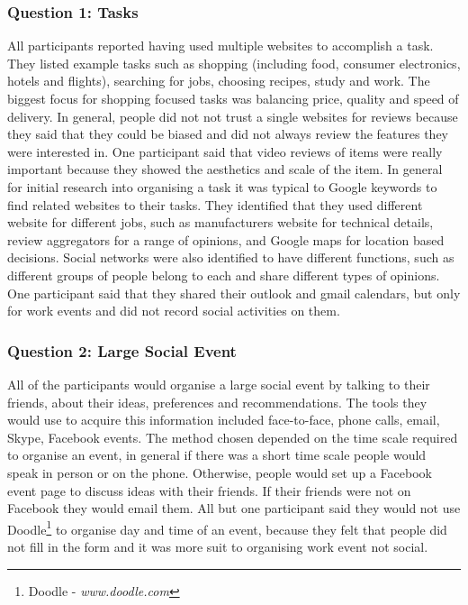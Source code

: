 \documentclass{sigchi}
\begin{document}
\subsubsection{Question 1: Tasks}
All participants reported having used multiple websites to accomplish a task.  They listed example tasks such as shopping (including food, consumer electronics, hotels and flights), searching for jobs, choosing recipes, study and work.  The biggest focus for shopping focused tasks was balancing price, quality and speed of delivery.  In general, people did not not trust a single websites for reviews because they said that they could be biased and did not always review the features they were interested in.  One participant said that video reviews of items were really important because they showed the aesthetics and scale of the item.  In general for initial research into organising a task it was typical to Google keywords to find related websites to their tasks.  They identified that they used different website for different jobs, such as manufacturers website for technical details, review aggregators for a range of opinions, and Google maps for location based decisions.  Social networks were also identified to have different functions, such as different groups of people belong to each and share different types of opinions.  One participant said that they shared their outlook and gmail calendars, but only for work events and did not record social activities on them.

\subsubsection{Question 2: Large Social Event}
All of the participants would organise a large social event by talking to their friends, about their ideas, preferences and recommendations.  The tools they would use to acquire this information included face-to-face, phone calls, email, Skype, Facebook events.  The method chosen depended on the time scale required to organise an event, in general if there was a short time scale people would speak in person or on the phone.  Otherwise, people would set up a Facebook event page to discuss ideas with their friends.  If their friends were not on Facebook they would email them.  All but one participant said they would not use Doodle\footnote{Doodle - \emph{www.doodle.com}} to organise day and time of an event, because they felt that people did not fill in the form and it was more suit to organising work event not social.  
\end{document}
